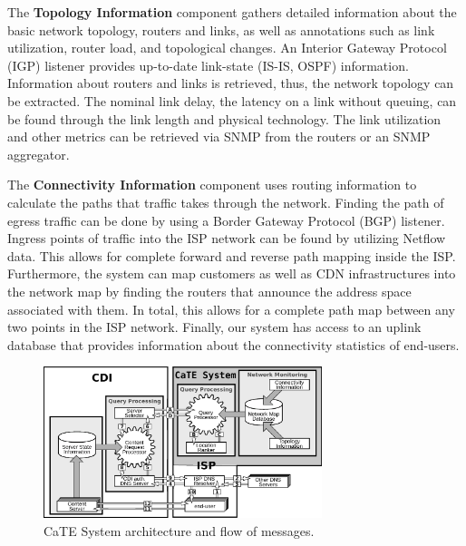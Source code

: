 The {\bf Topology Information} component gathers detailed information about the
basic network topology, \ie routers and links, as well as annotations such as
link utilization, router load, and topological changes.  An Interior Gateway
Protocol (IGP) listener provides up-to-date link-state (\ie IS-IS, OSPF)
information.  Information about routers and links is retrieved, thus, the
network topology can be extracted.  The nominal link delay, \ie the latency on
a link without queuing, can be found through the link length and physical
technology.  The link utilization and other metrics can be retrieved via SNMP
from the routers or an SNMP aggregator.

The {\bf Connectivity Information} component uses routing information to
calculate the paths that traffic takes through the network. Finding the path of
egress traffic can be done by using a Border Gateway Protocol (BGP) listener.
Ingress points of traffic into the ISP network can be found by utilizing
Netflow data. This allows for complete forward and reverse path mapping inside
the ISP.  Furthermore, the system can map customers as well as CDN
infrastructures into the network map by finding the routers that announce the
address space associated with them. In total, this allows for a complete path
map between any two points in the ISP network.  Finally, our system has access
to an uplink database that provides information about the connectivity
statistics of end-users.


\begin{figure}[tbp]
    \center \includegraphics[width=3.2in]{figures/CaTE_Schematic.eps}
  \vspace{-0.1in}
    \caption{CaTE System architecture and flow of messages.}
    \label{fig:CaTE-architecture}
    \vspace{-0.2in}
\end{figure}

